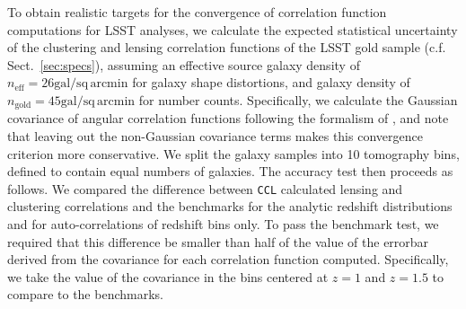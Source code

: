 \documentclass[\docopts]{\docclass}
\newcommand{\ccl}{{\tt CCL}\xspace}
\begin{document}
To obtain realistic targets for the convergence of correlation function computations for LSST analyses, we calculate the expected statistical uncertainty of the clustering and lensing correlation functions of the LSST gold sample (c.f. Sect.~\ref{sec:specs}), assuming an effective source galaxy density of $n_\mathrm{eff} = 26\mathrm{gal/sq\,arcmin}$ for galaxy shape distortions, and galaxy density of $n_\mathrm{gold} = 45\mathrm{gal/sq\,arcmin}$ for number counts. Specifically, we calculate the Gaussian covariance of angular correlation functions following the formalism of \citet{2008A&A...477...43J}, and note that leaving out the non-Gaussian covariance terms makes this convergence criterion more conservative. We split the galaxy samples into 10 tomography bins, defined to contain equal numbers of galaxies. The accuracy test then proceeds as follows. We compared the difference between \ccl calculated lensing and clustering correlations and the benchmarks for the analytic redshift distributions and for auto-correlations of redshift bins only. To pass the benchmark test, we required that this difference be smaller than half of the value of the errorbar derived from the covariance for each correlation function computed. Specifically, we take the value of the covariance in the bins centered at $z=1$ and $z=1.5$ to compare to the benchmarks.
\end{document}
